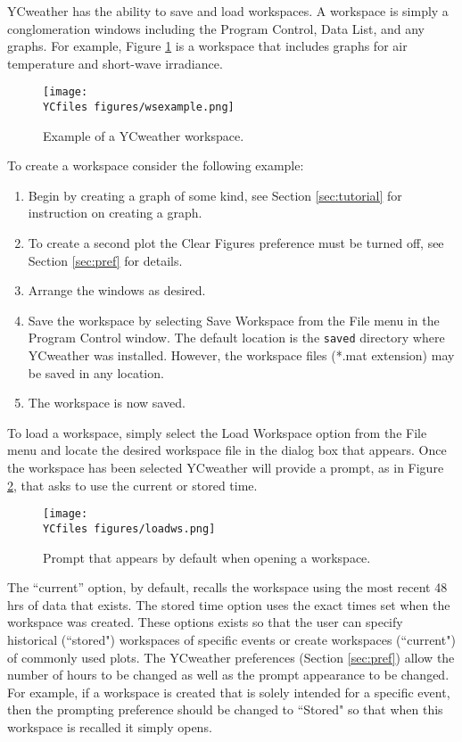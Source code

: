 \label{sec:workspace}
YCweather has the ability to save and load workspaces.  A workspace is simply a conglomeration windows including the Program Control, Data List, and any graphs.  For example, Figure \ref{fig:wsexample} is a workspace that includes graphs for air temperature and short-wave irradiance. 

\begin{figure}[h]\centering
	\texttt{[image: \\YCfiles figures/wsexample.png]}
	\caption{Example of a YCweather workspace.}
	\label{fig:wsexample}
\end{figure}

To create a workspace consider the following example:
\begin{enumerate}
	\item Begin by creating a graph of some kind, see Section \ref{sec:tutorial} for instruction on creating a graph.
	\item To create a second plot the Clear Figures preference must be turned off, see Section \ref{sec:pref} for details.
	\item Arrange the windows as desired.
	\item Save the workspace by selecting Save Workspace from the File menu in the Program Control window.  The default location is the \texttt{\bs saved} directory where YCweather was installed.  However, the workspace files (*.mat extension) may be saved in any location.
	\item The workspace is now saved.
\end{enumerate}

To load a workspace, simply select the Load Workspace option from the File menu and locate the desired workspace file in the dialog box that appears.  Once the workspace has been selected YCweather will provide a prompt, as in Figure \ref{fig:loadws}, that asks to use the current or stored time.  

\begin{figure}[ht!]\centering
	\texttt{[image: \\YCfiles figures/loadws.png]}
	\caption{Prompt that appears by default when opening a workspace.}
	\label{fig:loadws}
\end{figure}

The ``current'' option, by default, recalls the workspace using the most recent 48 hrs of data that exists.  The stored time option uses the exact times set when the workspace was created.  These options exists so that the user can specify historical (``stored") workspaces of specific events or create workspaces (``current") of commonly used plots.  The YCweather preferences (Section \ref{sec:pref}) allow the number of hours to be changed as well as the prompt appearance to be changed.  For example, if a workspace is created that is solely intended for a specific event, then the prompting preference should be changed to ``Stored" so that when this workspace is recalled it simply opens.